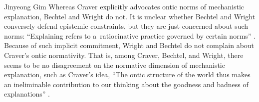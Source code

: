\begin{artengenv}{Jinyeong Gim}
Whereas Craver explicitly advocates ontic norms of mechanistic explanation, Bechtel and Wright do not. It is unclear whether Bechtel and Wright conversely defend epistemic constraints, but they are just concerned about such norms: ``Explaining refers to a~ratiocinative practice governed by certain norms''
\parencite[][p.51]{wright_mechanisms_2007}. %
 Because of such implicit commitment, Wright and Bechtel do not complain about Craver's ontic normativity. That is, among Craver, Bechtel, and Wright, there seems to be no disagreement on the normative dimension of mechanistic explanation, such as Craver's idea, ``The ontic structure of the world thus makes an ineliminable contribution to our thinking about the goodness and badness of explanations'' 
\parencite[][p.41]{kaiser_ontic_2014}.%



\end{artengenv}
